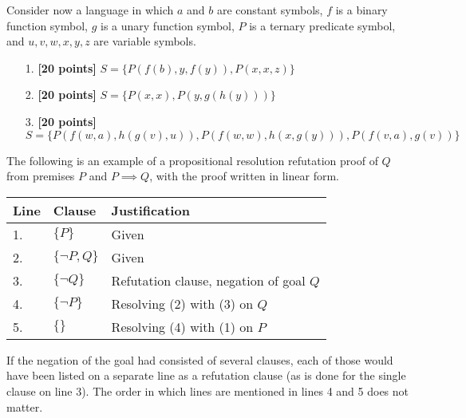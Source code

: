 \documentclass{article}
\begin{document}
Consider now a language in which $a$ and $b$ are constant symbols, $f$
is a binary function symbol, $g$ is a unary function symbol, $P$ is a
ternary predicate symbol, and $u,v,w,x,y,z$ are variable symbols.

\begin{enumerate}
\item[1.] \textbf{[20 points]} $S = \{ P(f(b),y,f(y)), P(x,x,z) \}$
\end{enumerate}

\begin{enumerate}
\item[2.] \textbf{[20 points]} $S = \{ P(x,x), P(y,g(h(y))) \}$
\end{enumerate}

\begin{enumerate}
\item[3.] \textbf{[20 points]}
  $S = \{ P(f(w,a),h(g(v),u)), P(f(w,w),h(x,g(y))), P(f(v,a),g(v)) \}$
\end{enumerate}

\newpage

The following is an example of a propositional resolution refutation
proof of $Q$ from premises $P$ and $P \implies Q$, with the proof
written in linear form.
\begin{center}
  \begin{tabular}{lll}
    Line & Clause & Justification \\ \hline
    1. & $\{ P \}$ & Given \\
    2. & $\{ \neg P, Q \}$ & Given \\ \hline
    3. & $\{ \neg Q \}$ & Refutation clause, negation of goal $Q$ \\
    4. & $\{ \neg P \}$ & Resolving (2) with (3) on $Q$  \\
    5. & $\{ \}$ & Resolving (4) with (1) on $P$  \\ 
  \end{tabular}
\end{center}
If the negation of the goal had consisted of several clauses, each of
those would have been listed on a separate line as a refutation clause
(as is done for the single clause on line 3).  The order in which
lines are mentioned in lines 4 and 5 does not matter.
\end{document}
